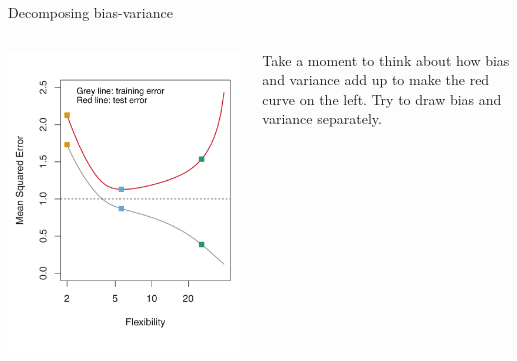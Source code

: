 \documentclass[aspectratio=169, handout]{beamer}
\begin{document}
\begin{frame}{Decomposing bias-variance}

\begin{columns}
\includegraphics[scale=0.25]{figures/islr2_9b.pdf}

Take a moment to think about how bias and variance add up to make the red curve on the left.  Try to draw bias and variance separately.  


\end{columns}
\end{frame}
\end{document}
